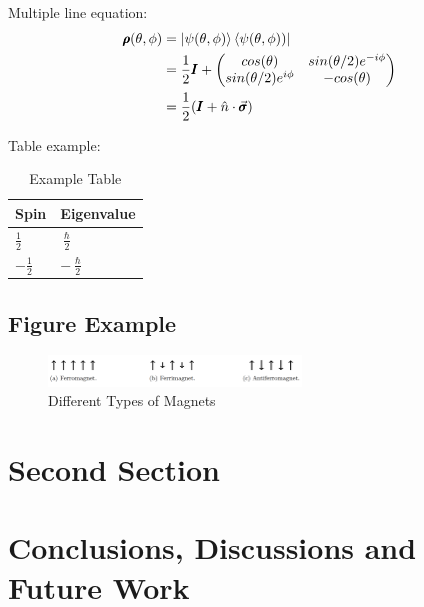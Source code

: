 \documentclass[12pt]{article}
\begin{document}
Multiple line equation:
\begin{equation}\label{eq:pareto mle2}
    \begin{aligned}
        \pmb{\rho}(\theta,\phi)&= \ket{\psi(\theta,\phi)}\bra{\psi(\theta,\phi))}
                  \\ & =\frac{1}{2}\pmb{I}+
        \begin{pmatrix}
               cos(\theta) & sin(\theta/2)e^{-i\phi}\\
               sin(\theta/2)e^{i\phi} & -cos(\theta)
        \end{pmatrix}
                  \\ & =\frac{1}{2}(\pmb{I}+\hat{n}\cdot\vec{\pmb{\sigma}})
    \end{aligned}
\end{equation} 

Table example:

\begin{table}[h!]
  \caption{Example Table}
  \centering
  \label{tab:tab1}
  \begin{tabularx}{\textwidth}{XX}
    \hline\hline
    Spin & Eigenvalue \\
    \hline\hline 
      $\frac{1}{2}$& $\frac{\hslash}{2}$\\
    \hline
    $-\frac{1}{2}$& $-\frac{\hslash}{2}$\\
    \hline
  \end{tabularx}
\end{table}


\subsection{Figure Example}


\begin{figure}[h!]
\centering
\includegraphics[width=0.6\textwidth]{Pics/Diff Type of Magnets.png}
\caption{Different Types of Magnets}
\label{fig:fig1}
\end{figure}   








 

\section{Second Section}




\section{Conclusions, Discussions and Future Work}






\end{document}
